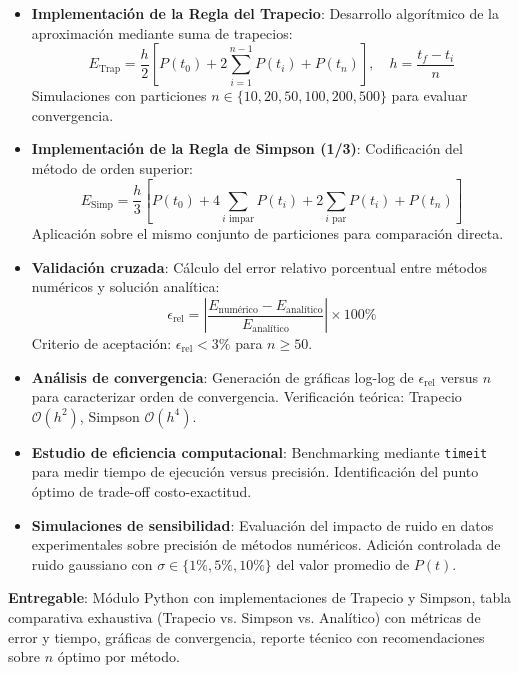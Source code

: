\begin{itemize}
    \item \textbf{Implementación de la Regla del Trapecio}: Desarrollo algorítmico de la aproximación mediante suma de trapecios:
    \[
    E_{\text{Trap}} = \frac{h}{2} \left[ P(t_0) + 2\sum_{i=1}^{n-1} P(t_i) + P(t_n) \right], \quad h = \frac{t_f - t_i}{n}
    \]
    Simulaciones con particiones $n \in \{10, 20, 50, 100, 200, 500\}$ para evaluar convergencia.
    
    \item \textbf{Implementación de la Regla de Simpson (1/3)}: Codificación del método de orden superior:
    \[
    E_{\text{Simp}} = \frac{h}{3} \left[ P(t_0) + 4\sum_{i \text{ impar}} P(t_i) + 2\sum_{i \text{ par}} P(t_i) + P(t_n) \right]
    \]
    Aplicación sobre el mismo conjunto de particiones para comparación directa.
    
    \item \textbf{Validación cruzada}: Cálculo del error relativo porcentual entre métodos numéricos y solución analítica:
    \[
    \epsilon_{\text{rel}} = \left| \frac{E_{\text{numérico}} - E_{\text{analítico}}}{E_{\text{analítico}}} \right| \times 100\%
    \]
    Criterio de aceptación: $\epsilon_{\text{rel}} < 3\%$ para $n \geq 50$.
    
    \item \textbf{Análisis de convergencia}: Generación de gráficas log-log de $\epsilon_{\text{rel}}$ versus $n$ para caracterizar orden de convergencia. Verificación teórica: Trapecio $\mathcal{O}(h^2)$, Simpson $\mathcal{O}(h^4)$.
    
    \item \textbf{Estudio de eficiencia computacional}: Benchmarking mediante \texttt{timeit} para medir tiempo de ejecución versus precisión. Identificación del punto óptimo de trade-off costo-exactitud.
    
    \item \textbf{Simulaciones de sensibilidad}: Evaluación del impacto de ruido en datos experimentales sobre precisión de métodos numéricos. Adición controlada de ruido gaussiano con $\sigma \in \{1\%, 5\%, 10\%\}$ del valor promedio de $P(t)$.
\end{itemize}

\textbf{Entregable}: Módulo Python con implementaciones de Trapecio y Simpson, tabla comparativa exhaustiva (Trapecio vs. Simpson vs. Analítico) con métricas de error y tiempo, gráficas de convergencia, reporte técnico con recomendaciones sobre $n$ óptimo por método.

